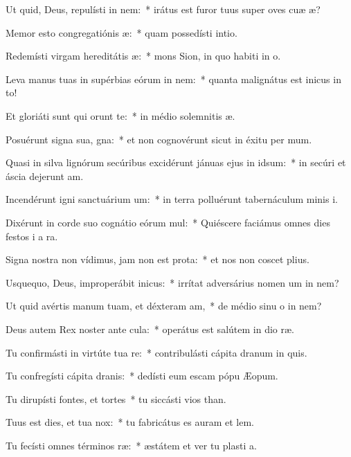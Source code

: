 \item Ut quid, Deus, repulísti in nem:~* irátus est furor tuus super oves cuæ æ?
\item Memor esto congregatiónis æ:~* quam possedísti  intio.
\item Redemísti virgam hereditátis æ:~* mons Sion, in quo habiti in o.
\item Leva manus tuas in supérbias eórum in nem:~* quanta malignátus est inicus in to!
\item Et gloriáti sunt qui orunt te:~* in médio solemnitis æ.
\item Posuérunt signa sua, gna:~* et non cognovérunt sicut in éxitu per mum.
\item Quasi in silva lignórum secúribus excidérunt jánuas ejus in idsum:~* in secúri et áscia dejerunt am.
\item Incendérunt igni sanctuárium um:~* in terra polluérunt tabernáculum minis i.
\item Dixérunt in corde suo cognátio eórum mul:~* Quiéscere faciámus omnes dies festos i a ra.
\item Signa nostra non vídimus, jam non est prota:~* et nos non coscet plius.
\item Usquequo, Deus, improperábit inicus:~* irrítat adversárius nomen um in nem?
\item Ut quid avértis manum tuam, et déxteram am,~* de médio sinu o in nem?
\item Deus autem Rex noster ante cula:~* operátus est salútem in dio ræ.
\item Tu confirmásti in virtúte tua re:~* contribulásti cápita dranum in quis.
\item Tu confregísti cápita dranis:~* dedísti eum escam pópu Æopum.
\item Tu dirupísti fontes, et tortes~* tu siccásti vios than.
\item Tuus est dies, et tua  nox:~* tu fabricátus es auram et lem.
\item Tu fecísti omnes términos ræ:~* æstátem et ver tu plasti a.
